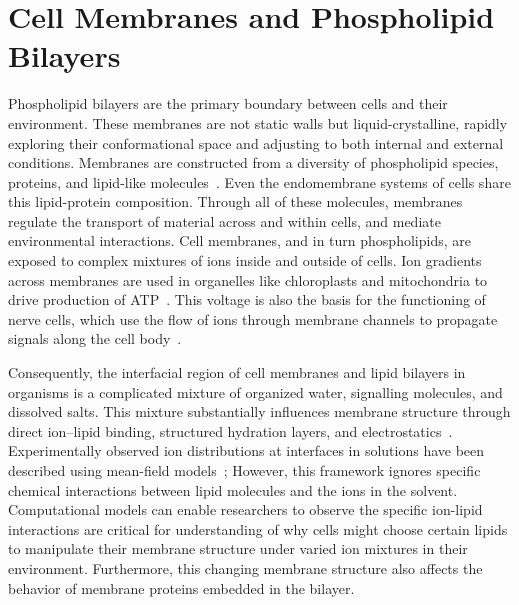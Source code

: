 \section{Cell Membranes and Phospholipid Bilayers}
Phospholipid bilayers are the primary boundary between cells and their environment. These membranes are not static walls but liquid-crystalline, rapidly exploring their 
conformational space and adjusting to both internal and external conditions. Membranes are constructed from a diversity of phospholipid species, 
proteins, and lipid-like molecules~\cite{alberts:2022:molecular}. Even the endomembrane systems of cells share this lipid-protein composition. 
Through all of these molecules, membranes 
regulate the transport of material across and within cells, and mediate environmental interactions.
Cell membranes, and in turn phospholipids, are exposed to complex
mixtures of ions inside and outside of cells. Ion gradients across membranes are 
used in organelles like chloroplasts and mitochondria to drive production of ATP~\cite{reece:2014:biobook,alberts:2022:molecular}.
This voltage is also the basis for the functioning of nerve cells, which use the flow of ions through membrane channels to propagate signals
along the cell body~\cite{alberts:2022:molecular}. 

Consequently, the interfacial region of cell membranes and lipid bilayers in organisms is a 
complicated mixture of organized water, signalling molecules, and dissolved salts. 
This mixture substantially influences membrane structure through direct ion–lipid binding, structured hydration layers, and electrostatics~\cite{pandit:2003:dppc:na,Berkowitz:2006}.
Experimentally observed ion distributions at interfaces in solutions have been described using mean-field models~\cite{israelachvili:2011:intermol};
However, this framework ignores specific chemical interactions between lipid molecules and the ions in the solvent.
Computational models can enable researchers to observe the specific ion-lipid interactions are critical for understanding of 
why cells might choose certain lipids to manipulate their membrane structure under varied ion mixtures in their environment. Furthermore, this 
changing membrane structure also affects the behavior of membrane proteins embedded in the bilayer.
